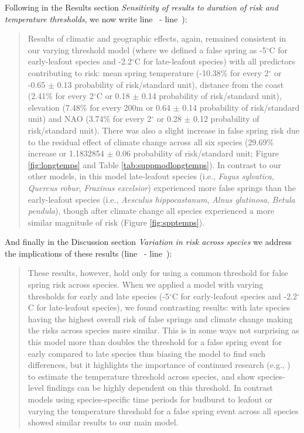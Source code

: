 \documentclass[11pt,a4paper]{article}\usepackage[]{graphicx}\usepackage[]{color}
\newcommand{\lr}[1]{line~\lineref{#1}}
\begin{document}
Following in the Results section \textit{Sensitivity of results to duration of risk and temperature thresholds}, we now write \lr{Z2thresh} - \lr{Z2threshend}): \\

\begin{quotation}
\noindent  Results of climatic and geographic effects, again, remained consistent in our varying threshold model (where we defined a false spring as -5$^{\circ}$C for early-leafout species and -2.2$^{\circ}$C for late-leafout species) with all predictors contributing to risk: mean spring temperature (-10.38\% for every 2$^\circ$ or -0.65 $\pm$ 0.13 probability of risk/standard unit), distance from the coast (2.41\% for every 2$^\circ$C or 0.18 $\pm$ 0.14 probability of risk/standard unit), elevation (7.48\% for every 200m or 0.64 $\pm$ 0.14 probability of risk/standard unit) and NAO (3.74\% for every 2$^\circ$ or 0.28 $\pm$ 0.12 probability of risk/standard unit). There was also a slight increase in false spring risk due to the residual effect of climate change across all six species (29.69\% increase or 1.1832854 $\pm$ 0.06 probability of risk/standard unit; Figure \ref{fig:longtemps} and Table \ref{tab:suppmodlongtemps}). In contrast to our other models, in this model late-leafout species (i.e., \textit{Fagus sylvatica}, \textit{Quercus robur}, \textit{Fraxinus excelsior}) experienced more false springs than the early-leafout species (i.e., \textit{Aesculus hippocastanum}, \textit{Alnus glutinosa}, \textit{Betula pendula}), though after climate change all species experienced a more similar magnitude of risk (Figure \ref{fig:spptemps}). 
\end{quotation}

And finally in the Discussion section \textit{Variation in risk across species} we address the implications of these results (\lr{Z3thresh} - \lr{Z3threshend}):

\begin{quotation}
\noindent These results, however, hold only for using a common threshold for false spring risk across species. When we applied a model with varying thresholds for early and late species (-5$^{\circ}$C for early-leafout species and -2.2$^{\circ}$C for late-leafout species), we found contrasting results: with late species having the highest overall risk of false springs and climate change making the risks across species more similar. This is in some ways not surprising as this model more than doubles the threshold for a false spring event for early compared to late species thus biasing the model to find such differences, but it highlights the importance of continued research (e.g., \citep{Lenz2013,Muffler2016,Zohner2020}) to estimate the temperature threshold across species, and show species-level findings can be highly dependent on this threshold. In contrast models using species-specific time periods for budburst to leafout or varying the temperature threshold for a false spring event across all species showed similar results to our main model.
\end{quotation}
\end{document}
